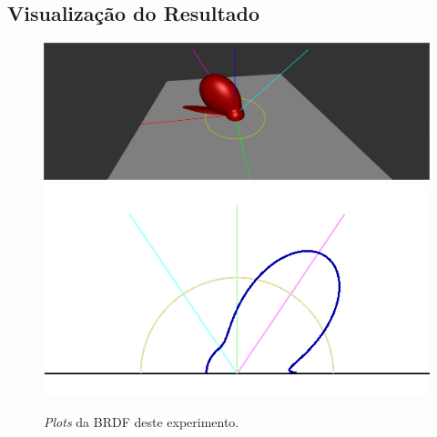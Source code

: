 \subsection{Visualização do Resultado}
\begin{figure}[H]
    \caption{\small{\textit{Plots} da BRDF deste experimento.}}\label{fig-ward-plots}
    \vspace{42px}
  \includegraphics[width=\linewidth]{./Imagens/brdfs/ward-3D-plot}
\endminipage\hfill
{}
  \includegraphics[width=\linewidth]{./Imagens/brdfs/ward-polar-plot.png}
\endminipage\hfill
\end{figure}

